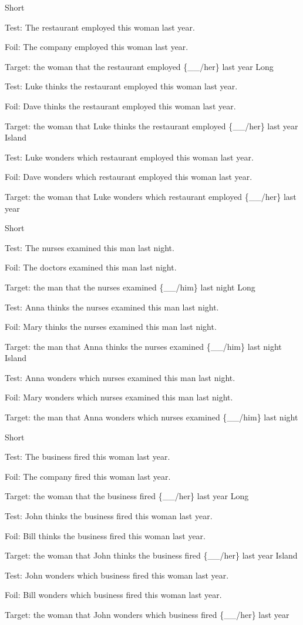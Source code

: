 \pex %
\a Short\par\nobreak
Test: The restaurant employed this woman last year.\par\nobreak
Foil: The company employed this woman last year.\par\nobreak
Target: the woman that the restaurant employed \{\_\_/her\} last year
\a Long\par\nobreak
Test: Luke thinks the restaurant employed this woman last year.\par\nobreak
Foil: Dave thinks the restaurant employed this woman last year.\par\nobreak
Target: the woman that Luke thinks the restaurant employed \{\_\_/her\} last year
\a Island\par\nobreak
Test: Luke wonders which restaurant employed this woman last year.\par\nobreak
Foil: Dave wonders which restaurant employed this woman last year.\par\nobreak
Target: the woman that Luke wonders which restaurant employed \{\_\_/her\} last year
\xe

\pex %
\a Short\par\nobreak
Test: The nurses examined this man last night.\par\nobreak
Foil: The doctors examined this man last night.\par\nobreak
Target: the man that the nurses examined \{\_\_/him\} last night
\a Long\par\nobreak
Test: Anna thinks the nurses examined this man last night.\par\nobreak
Foil: Mary thinks the nurses examined this man last night.\par\nobreak
Target: the man that Anna thinks the nurses examined \{\_\_/him\} last night
\a Island\par\nobreak
Test: Anna wonders which nurses examined this man last night.\par\nobreak
Foil: Mary wonders which nurses examined this man last night.\par\nobreak
Target: the man that Anna wonders which nurses examined \{\_\_/him\} last night
\xe

\pex %
\a Short\par\nobreak
Test: The business fired this woman last year.\par\nobreak
Foil: The company fired this woman last year.\par\nobreak
Target: the woman that the business fired \{\_\_/her\} last year
\a Long\par\nobreak
Test: John thinks the business fired this woman last year.\par\nobreak
Foil: Bill thinks the business fired this woman last year.\par\nobreak
Target: the woman that John thinks the business fired \{\_\_/her\} last year
\a Island\par\nobreak
Test: John wonders which business fired this woman last year.\par\nobreak
Foil: Bill wonders which business fired this woman last year.\par\nobreak
Target: the woman that John wonders which business fired \{\_\_/her\} last year
\xe

